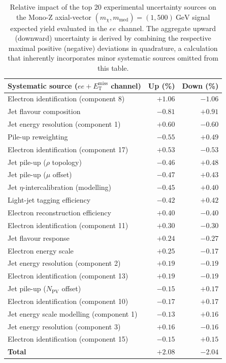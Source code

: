 \begin{table}[!htbp]
\centering
\begin{tabular}{lrr}
\toprule
\textbf{Systematic source} ($ee + E_{\text{T}}^{\text{miss}}$ channel) & \textbf{Up (\%)} & \textbf{Down (\%)} \\
\midrule
Electron identification (component 8)           & $+1.06$ & $-1.06$ \\
Jet flavour composition                         & $-0.81$ & $+0.91$ \\
Jet energy resolution (component 1)             & $+0.60$ & $-0.60$ \\
Pile-up reweighting                             & $-0.55$ & $+0.49$ \\
Electron identification (component 17)          & $+0.53$ & $-0.53$ \\
Jet pile-up ($\rho$ topology)                   & $-0.46$ & $+0.48$ \\
Jet pile-up ($\mu$ offset)                      & $-0.47$ & $+0.43$ \\
Jet $\eta$-intercalibration (modelling)         & $-0.45$ & $+0.40$ \\
Light-jet tagging efficiency                    & $-0.42$ & $+0.42$ \\
Electron reconstruction efficiency              & $+0.40$ & $-0.40$ \\
Electron identification (component 11)          & $+0.30$ & $-0.30$ \\
Jet flavour response                            & $+0.24$ & $-0.27$ \\
Electron energy scale                           & $+0.25$ & $-0.17$ \\
Jet energy resolution (component 2)             & $+0.19$ & $-0.19$ \\
Electron identification (component 13)          & $+0.19$ & $-0.19$ \\
Jet pile-up ($N_{\text{PV}}$ offset)            & $-0.15$ & $+0.17$ \\
Electron identification (component 10)          & $-0.17$ & $+0.17$ \\
Jet energy scale modelling (component 1)        & $-0.13$ & $+0.16$ \\
Jet energy resolution (component 3)             & $+0.16$ & $-0.16$ \\
Electron identification (component 15)          & $-0.15$ & $+0.15$ \\    
\midrule
\textbf{Total} & $+2.08$ & $-2.04$ \\ 
\bottomrule
\end{tabular}
\caption{\rm Relative impact of the top 20 experimental uncertainty sources on the Mono-$\text{Z}$ axial-vector $(m_\chi, m_{\text{med}}) = (1, 500)~\text{GeV}$ signal expected yield evaluated in the $ee$ channel. The aggregate upward (downward) uncertainty is derived by combining the respective maximal positive (negative) deviations in quadrature, a calculation that inherently incorporates minor systematic sources omitted from this table.}
\label{tab:syst-uncertainties-MonoZ-ee}
\end{table}

